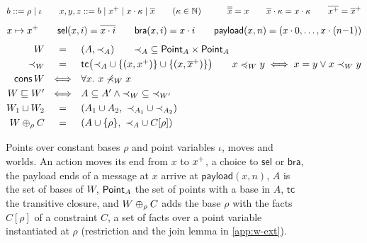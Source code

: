 \begin{figure}[tb]
  \small
  \[
  \begin{array}{@{}c@{}}
    b ::= \rho \mid \iota \qquad
    x, y, z ::= b \mid \pplus{x} \mid \fld{x}{\kappa} \mid \dual{x} \qquad (\kappa \in \mathbb{N})
    \qquad\quad
    \dual{\dual{x}} = x \qquad \fld{\dual{x}}{\kappa} = \fld{x}{\kappa} \qquad \dual{\pplus{x}} = \pplus{\dual{x}}
  \end{array}
  \]
  \[
    x \mapsto x^{+} \qquad
    \mathsf{sel}(x, i) = \overline{x\cdot i} \qquad
    \mathsf{bra}(x, i) = x\cdot i \qquad
    \mathsf{payload}(x, n) = (x\cdot 0, \ldots, x\cdot (n{-}1))
  \]
  \[
  \begin{array}{@{}r@{\ \ }c@{\ \ }l@{}}
    W & = & (A, {\prec_A}) \qquad {\prec_A} \subseteq \Point_A \times \Point_A \\[3pt]
    {\ordW} & = & \mathsf{tc}\big({\prec_A} \cup \{(x, \pplus{x})\} \cup \{(x, \pplus{\dual{x}})\}\big) \qquad
    x \preccurlyeq_W y \iff x = y \lor x \ordW y \\[3pt]
    \cons\,W & \iff & \forall x.\ x \not\ordW x \\[3pt]
    W \wext W' & \iff & A \subseteq A' \land {\ordW} \subseteq {\ordW[W']} \\[3pt]
    W_1 \wjoin W_2 & = & (A_1 \cup A_2,\ {\prec_{A_1}} \cup {\prec_{A_2}}) \\[3pt]
    W \grow{\rho}{C} & = & (A \cup \{\rho\},\ {\prec_A} \cup C[\rho])
  \end{array}
  \]
  \figrule
  \caption{Points over constant bases $\rho$ and point variables $\iota$, moves and worlds. An action moves its end from $x$ to $x^{+}$, a choice to $\mathsf{sel}$ or $\mathsf{bra}$, the payload ends of a message at $x$ arrive at $\mathsf{payload}(x, n)$, $A$ is the set of bases of $W$, $\mathsf{Point}_A$ the set of points with a base in $A$, $\mathsf{tc}$ the transitive closure, and $W \oplus_{\rho} C$ adds the base $\rho$ with the facts $C[\rho]$ of a constraint $C$, a set of facts over a point variable instantiated at $\rho$ (restriction and the join lemma in \cref{app:w-ext}).}
  \label{fig:worlds}
\end{figure}
